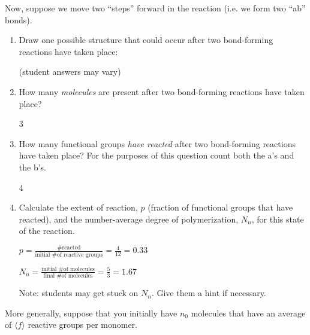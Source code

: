 \begin{activity}
\begin{ctqs}
\begin{enumerate}
		\end{enumerate}
		
	\question Now, suppose we move two ``steps'' forward in the reaction (i.e. we form two ``ab'' bonds).
	
		\begin{enumerate}
		
			\item Draw one possible structure that could occur after two bond-forming reactions have taken place:
			
				\begin{solution}[1.75in]
				
					(student answers may vary)
					
				\end{solution}
			
			\item How many \emph{molecules} are present after two bond-forming reactions have taken place?
			
				\begin{solution}[0.5in]
					3
				\end{solution}
			
			\item How many functional groups \emph{have reacted} after two bond-forming reactions have taken place?  For the purposes of this question count both the a's and the b's.
			
				\begin{solution}[0.5in]
					4
				\end{solution}
				
			\item Calculate the extent of reaction, $p$ (fraction of functional groups that have reacted), and the number-average degree of polymerization, $N_n$, for this state of the reaction.
			
				\begin{solution}[2.25in]
					$p = \frac{\text{\# reacted}}{\text{initial \# of reactive groups}} = \frac{4}{12} = 0.33$
					
					$N_n = \frac{\text{initial \# of molecules}}{\text{final \# of molecules}} = \frac{5}{3} = 1.67$
					
					Note: students may get stuck on $N_n$.  Give them a hint if necessary.
				\end{solution}
		\end{enumerate}

	\question More generally, suppose that you initially have $n_0$ molecules that have an average of $\langle f\rangle$ reactive groups per monomer.  
	

\end{ctqs}
\end{activity}
